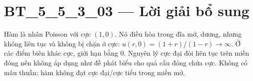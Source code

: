 \documentclass[10pt,a4paper]{article}
\begin{document}
\section*{BT\_5\_5\_3\_03 — Lời giải bổ sung}
Hàm là nhân Poisson với cực $(1,0)$. Nó điều hòa trong đĩa mở, dương, nhưng không liên tục và không bị chặn ở cực: $u(r,0)=(1+r)/(1-r)\to\infty$. Ở các điểm biên khác cực, giới hạn bằng 0. Nguyên lý cực đại đòi liên tục trên miền đóng nên không áp dụng như đề phát biểu cho quả cầu đóng chứa cực. Không có mâu thuẫn: hàm không đạt cực đại/cực tiểu trong miền mở.
\end{document}

